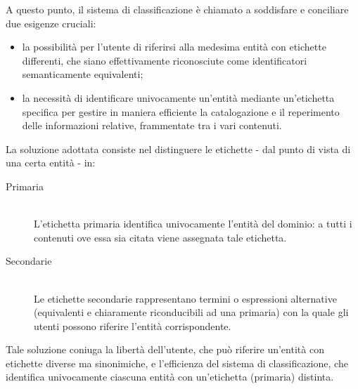 \documentclass[10pt,a4paper,headinclude,footinclude,hidelinks]{scrreprt} %
\begin{document}
	A questo punto, il sistema di classificazione è chiamato a soddisfare e conciliare due esigenze cruciali:
	\begin{itemize}
	\item la possibilità per l'utente di riferirsi alla medesima entità con etichette differenti, che siano effettivamente riconosciute come identificatori semanticamente equivalenti;
	\item la necessità di identificare univocamente un'entità mediante un'etichetta specifica per gestire in maniera efficiente la catalogazione e il reperimento delle informazioni relative, frammentate tra i vari contenuti.
	\end{itemize}


	La soluzione adottata consiste nel distinguere le etichette - dal punto di vista di una certa entità - in:
	\begin{description}
	\item[Primaria] \hfill \\
	L'etichetta primaria identifica univocamente l'entità del dominio: a tutti i contenuti ove essa sia citata viene assegnata tale etichetta.
	\item[Secondarie] \hfill \\
	Le etichette secondarie rappresentano termini o espressioni alternative (equivalenti e chiaramente riconducibili ad una primaria) con la quale gli utenti possono riferire l'entità corrispondente.
	\end{description}


	Tale soluzione coniuga la libertà dell'utente, che può riferire un'entità con etichette diverse ma sinonimiche, e l'efficienza del sistema di classificazione, che identifica univocamente ciascuna entità con un'etichetta (primaria) distinta.
\end{document}
